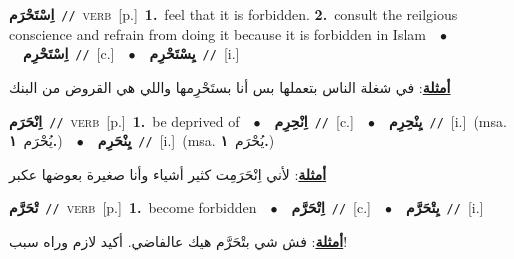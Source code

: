 \documentclass[10pt,a4paper,twoside]{article} %
\begin{document}
\begin{multicols}{2}
{\setlength\topsep{0pt}\textbf{\foreignlanguage{arabic}{اِسْتَحْرَم}}\ {\color{gray}\texttt{//}\color{black}}\ \textsc{verb}\ [p.]\ \textbf{1.}~feel that it is forbidden.  \textbf{2.}~consult the reilgious conscience and refrain from doing it because it is forbidden in Islam\ \ $\bullet$\ \ \setlength\topsep{0pt}\textbf{\foreignlanguage{arabic}{اِسْتَحْرِم}}\ {\color{gray}\texttt{//}\color{black}}\ [c.]\ \ $\bullet$\ \ \setlength\topsep{0pt}\textbf{\foreignlanguage{arabic}{يِسْتَحْرِم}}\ {\color{gray}\texttt{//}\color{black}}\ [i.]\  \begin{flushright}\color{gray}\foreignlanguage{arabic}{\textbf{\underline{\foreignlanguage{arabic}{أمثلة}}}: في شغلة الناس بتعملها بس أنا بستَحْرِمها واللي هي القروض من البنك}\end{flushright}\color{black}} \vspace{2mm}

{\setlength\topsep{0pt}\textbf{\foreignlanguage{arabic}{اِنْحَرَم}}\ {\color{gray}\texttt{//}\color{black}}\ \textsc{verb}\ [p.]\ \textbf{1.}~be deprived of\ \ $\bullet$\ \ \setlength\topsep{0pt}\textbf{\foreignlanguage{arabic}{اِنْحِرِم}}\ {\color{gray}\texttt{//}\color{black}}\ [c.]\ \ $\bullet$\ \ \setlength\topsep{0pt}\textbf{\foreignlanguage{arabic}{يِنْحِرِم}}\ {\color{gray}\texttt{//}\color{black}}\ [i.]\ \color{gray}(msa. \foreignlanguage{arabic}{يُحْرَم}~\foreignlanguage{arabic}{\textbf{١.}})\color{black}\ \ $\bullet$\ \ \setlength\topsep{0pt}\textbf{\foreignlanguage{arabic}{يِنْحَرِم}}\ {\color{gray}\texttt{//}\color{black}}\ [i.]\ \color{gray}(msa. \foreignlanguage{arabic}{يُحْرَم}~\foreignlanguage{arabic}{\textbf{١.}})\color{black}\  \begin{flushright}\color{gray}\foreignlanguage{arabic}{\textbf{\underline{\foreignlanguage{arabic}{أمثلة}}}: لأني اِنْحَرَمِت كثير أشياء وأنا صغيرة بعوضها عكبر}\end{flushright}\color{black}} \vspace{2mm}

{\setlength\topsep{0pt}\textbf{\foreignlanguage{arabic}{تْحَرَّم}}\ {\color{gray}\texttt{//}\color{black}}\ \textsc{verb}\ [p.]\ \textbf{1.}~become forbidden\ \ $\bullet$\ \ \setlength\topsep{0pt}\textbf{\foreignlanguage{arabic}{اِتْحَرَّم}}\ {\color{gray}\texttt{//}\color{black}}\ [c.]\ \ $\bullet$\ \ \setlength\topsep{0pt}\textbf{\foreignlanguage{arabic}{يِتْحَرَّم}}\ {\color{gray}\texttt{//}\color{black}}\ [i.]\  \begin{flushright}\color{gray}\foreignlanguage{arabic}{\textbf{\underline{\foreignlanguage{arabic}{أمثلة}}}: فش شي بتْحَرَّم هيك عالفاضي. أكيد لازم وراه سبب!}\end{flushright}\color{black}} \vspace{2mm}


\end{multicols}
\end{document}
